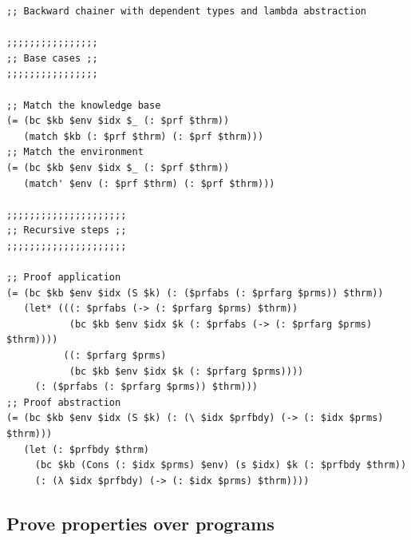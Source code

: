 \documentclass[aspectratio=169]{beamer}
\begin{document}
\begin{frame}[fragile]


  \begin{lstlisting}
;; Backward chainer with dependent types and lambda abstraction

;;;;;;;;;;;;;;;;
;; Base cases ;;
;;;;;;;;;;;;;;;;

;; Match the knowledge base
(= (bc $kb $env $idx $_ (: $prf $thrm))
   (match $kb (: $prf $thrm) (: $prf $thrm)))
;; Match the environment
(= (bc $kb $env $idx $_ (: $prf $thrm))
   (match' $env (: $prf $thrm) (: $prf $thrm)))

;;;;;;;;;;;;;;;;;;;;;
;; Recursive steps ;;
;;;;;;;;;;;;;;;;;;;;;

;; Proof application
(= (bc $kb $env $idx (S $k) (: ($prfabs (: $prfarg $prms)) $thrm))
   (let* (((: $prfabs (-> (: $prfarg $prms) $thrm))
           (bc $kb $env $idx $k (: $prfabs (-> (: $prfarg $prms) $thrm))))
          ((: $prfarg $prms)
           (bc $kb $env $idx $k (: $prfarg $prms))))
     (: ($prfabs (: $prfarg $prms)) $thrm)))
;; Proof abstraction
(= (bc $kb $env $idx (S $k) (: (\ $idx $prfbdy) (-> (: $idx $prms) $thrm)))
   (let (: $prfbdy $thrm)
     (bc $kb (Cons (: $idx $prms) $env) (s $idx) $k (: $prfbdy $thrm))
     (: (λ $idx $prfbdy) (-> (: $idx $prms) $thrm))))
  \end{lstlisting}

\end{frame}

\subsection{Prove properties over programs}

\end{document}
